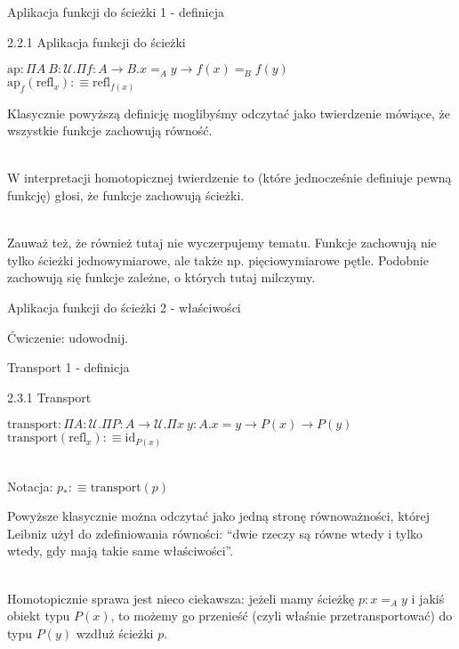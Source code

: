 \documentclass{beamer}
\newcommand{\defn}{:\equiv}
\newcommand{\U}{\mathcal{U}}
\newcommand{\refl}[1]{\text{refl}_{#1}}
\newcommand{\ap}[2]{\text{ap}_{#1}(#2)}
\begin{document}
\begin{frame}{Aplikacja funkcji do ścieżki 1 - definicja}

\begin{block}{2.2.1 Aplikacja funkcji do ścieżki}

$\text{ap} : \Pi A\ B : \U. \Pi f : A \to B. x =_A y \to f(x) =_B f(y)$ \\
$\ap{f}{\refl{x}} \defn \refl{f(x)}$

\end{block}

Klasycznie powyższą definicję moglibyśmy odczytać jako twierdzenie mówiące, że wszystkie funkcje zachowują równość. \\~\

W interpretacji homotopicznej twierdzenie to (które jednocześnie definiuje pewną funkcję) głosi, że funkcje zachowują ścieżki. \\~\

Zauważ też, że również tutaj nie wyczerpujemy tematu. Funkcje zachowują nie tylko ścieżki jednowymiarowe, ale także np. pięciowymiarowe pętle. Podobnie zachowują się funkcje zależne, o których tutaj milczymy.

\end{frame}

\begin{frame}{Aplikacja funkcji do ścieżki 2 - właściwości}

Ćwiczenie: udowodnij.

\end{frame}

\begin{frame}{Transport 1 - definicja}

\begin{block}{2.3.1 Transport}

$\text{transport} : \Pi A : \U. \Pi P : A \to \U. \Pi x\ y : A. x = y \to P(x) \to P(y)$ \\
$\text{transport}(\refl{x}) \defn \text{id}_{P(x)}$ \\~\

Notacja: $p_* \defn \text{transport}(p)$

\end{block}

Powyższe klasycznie można odczytać jako jedną stronę równoważności, której Leibniz użył do zdefiniowania równości: ``dwie rzeczy są równe wtedy i tylko wtedy, gdy mają takie same właściwości''.\\~\

Homotopicznie sprawa jest nieco ciekawsza: jeżeli mamy ścieżkę $p : x =_A y$ i jakiś obiekt typu $P(x)$, to możemy go przenieść (czyli właśnie przetransportować) do typu $P(y)$ wzdłuż ścieżki $p$.

\end{frame}
\end{document}
